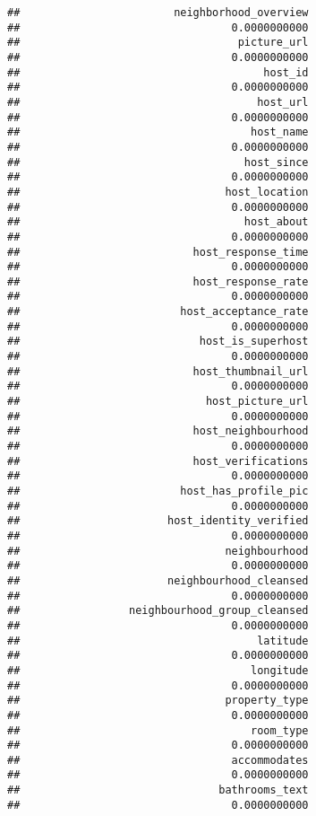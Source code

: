 \documentclass[
]{article}
\begin{document}
\begin{verbatim}
##                        neighborhood_overview 
##                                 0.0000000000 
##                                  picture_url 
##                                 0.0000000000 
##                                      host_id 
##                                 0.0000000000 
##                                     host_url 
##                                 0.0000000000 
##                                    host_name 
##                                 0.0000000000 
##                                   host_since 
##                                 0.0000000000 
##                                host_location 
##                                 0.0000000000 
##                                   host_about 
##                                 0.0000000000 
##                           host_response_time 
##                                 0.0000000000 
##                           host_response_rate 
##                                 0.0000000000 
##                         host_acceptance_rate 
##                                 0.0000000000 
##                            host_is_superhost 
##                                 0.0000000000 
##                           host_thumbnail_url 
##                                 0.0000000000 
##                             host_picture_url 
##                                 0.0000000000 
##                           host_neighbourhood 
##                                 0.0000000000 
##                           host_verifications 
##                                 0.0000000000 
##                         host_has_profile_pic 
##                                 0.0000000000 
##                       host_identity_verified 
##                                 0.0000000000 
##                                neighbourhood 
##                                 0.0000000000 
##                       neighbourhood_cleansed 
##                                 0.0000000000 
##                 neighbourhood_group_cleansed 
##                                 0.0000000000 
##                                     latitude 
##                                 0.0000000000 
##                                    longitude 
##                                 0.0000000000 
##                                property_type 
##                                 0.0000000000 
##                                    room_type 
##                                 0.0000000000 
##                                 accommodates 
##                                 0.0000000000 
##                               bathrooms_text 
##                                 0.0000000000 

\end{verbatim}
\end{document}
